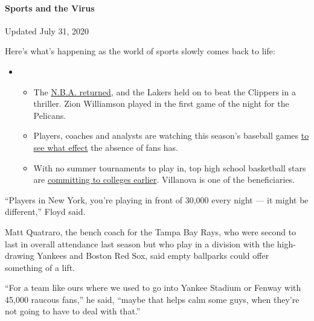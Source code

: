 \hypertarget{sports-and-the-virus}{%
\paragraph{Sports and the Virus}\label{sports-and-the-virus}}

Updated July 31, 2020

Here's what's happening as the world of sports slowly comes back to
life:

\begin{itemize}
\item
  \begin{itemize}
  \tightlist
  \item
    The
    \href{https://www.nytimes3xbfgragh.onion/2020/07/30/sports/basketball/clippers-lakers.html?action=click\&pgtype=Article\&state=default\&region=MAIN_CONTENT_2\&context=storylines_keepup}{N.B.A.
    returned}, and the Lakers held on to beat the Clippers in a
    thriller. Zion Williamson played in the first game of the night for
    the Pelicans.
  \item
    Players, coaches and analysts are watching this season's baseball
    games
    \href{https://www.nytimes3xbfgragh.onion/2020/07/31/sports/baseball/baseball-empty-stadiums-effects.html?action=click\&pgtype=Article\&state=default\&region=MAIN_CONTENT_2\&context=storylines_keepup}{to
    see what effect} the absence of fans has.
  \item
    With no summer tournaments to play in, top high school basketball
    stars are
    \href{https://www.nytimes3xbfgragh.onion/2020/07/30/sports/ncaabasketball/college-basketball-recruiting.html?action=click\&pgtype=Article\&state=default\&region=MAIN_CONTENT_2\&context=storylines_keepup}{committing
    to colleges earlier}. Villanova is one of the beneficiaries.
  \end{itemize}
\end{itemize}

``Players in New York, you're playing in front of 30,000 every night ---
it might be different,'' Floyd said.

Matt Quatraro, the bench coach for the Tampa Bay Rays, who were second
to last in overall attendance last season but who play in a division
with the high-drawing Yankees and Boston Red Sox, said empty ballparks
could offer something of a lift.

``For a team like ours where we used to go into Yankee Stadium or Fenway
with 45,000 raucous fans,'' he said, ``maybe that helps calm some guys,
when they're not going to have to deal with that.''

